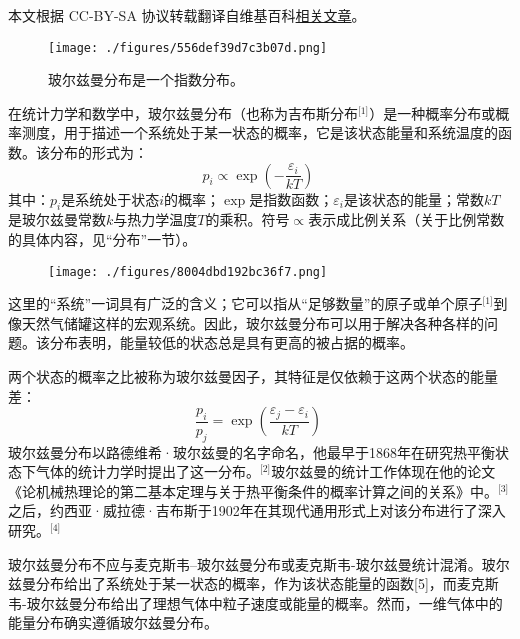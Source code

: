 
本文根据 CC-BY-SA 协议转载翻译自维基百科\href{https://en.wikipedia.org/wiki/Boltzmann_distribution}{相关文章}。

\begin{figure}[ht]
\centering
\texttt{[image: ./figures/556def39d7c3b07d.png]}
\caption{玻尔兹曼分布是一个指数分布。} \label{fig_BRCMLZ_1}
\end{figure}
在统计力学和数学中，玻尔兹曼分布（也称为吉布斯分布\(^\text{[1]}\)）是一种概率分布或概率测度，用于描述一个系统处于某一状态的概率，它是该状态能量和系统温度的函数。该分布的形式为：
\[
p_i \propto \exp\left(-\frac{\varepsilon_i}{kT}\right)~
\]
其中：\( p_i \)是系统处于状态\( i \)的概率；\( \exp \)是指数函数；\( \varepsilon_i \)是该状态的能量；常数\( kT \)是玻尔兹曼常数\( k \)与热力学温度\( T \)的乘积。符号\( \propto \)表示成比例关系（关于比例常数的具体内容，见“分布”一节）。
\begin{figure}[ht]
\centering
\texttt{[image: ./figures/8004dbd192bc36f7.png]}
\caption{} \label{fig_BRCMLZ_2}
\end{figure}
这里的“系统”一词具有广泛的含义；它可以指从“足够数量”的原子或单个原子\(^\text{[1]}\)到像天然气储罐这样的宏观系统。因此，玻尔兹曼分布可以用于解决各种各样的问题。该分布表明，能量较低的状态总是具有更高的被占据的概率。

两个状态的概率之比被称为玻尔兹曼因子，其特征是仅依赖于这两个状态的能量差：
\[
\frac{p_i}{p_j} = \exp\left(\frac{\varepsilon_j - \varepsilon_i}{kT}\right)~
\]
玻尔兹曼分布以路德维希·玻尔兹曼的名字命名，他最早于1868年在研究热平衡状态下气体的统计力学时提出了这一分布。\(^\text{[2]}\)玻尔兹曼的统计工作体现在他的论文《论机械热理论的第二基本定理与关于热平衡条件的概率计算之间的关系》中。\(^\text{[3]}\)之后，约西亚·威拉德·吉布斯于1902年在其现代通用形式上对该分布进行了深入研究。\(^\text{[4]}\)

玻尔兹曼分布不应与麦克斯韦–玻尔兹曼分布或麦克斯韦-玻尔兹曼统计混淆。玻尔兹曼分布给出了系统处于某一状态的概率，作为该状态能量的函数[5]，而麦克斯韦-玻尔兹曼分布给出了理想气体中粒子速度或能量的概率。然而，一维气体中的能量分布确实遵循玻尔兹曼分布。
